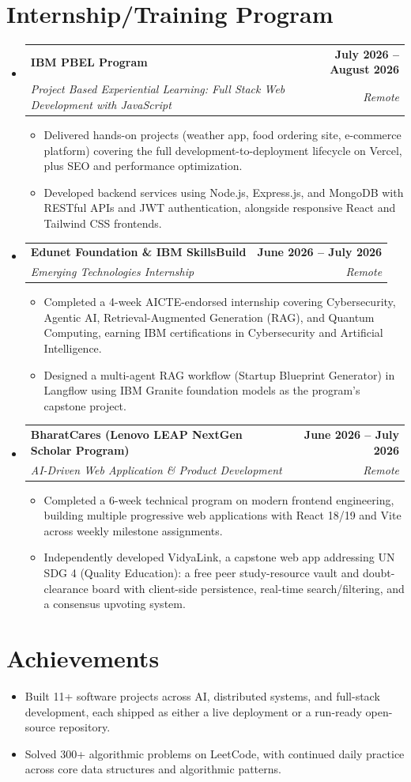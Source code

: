 \documentclass[letterpaper,10pt]{article}
\makeatletter
\newcommand{\resumeItem}[1]{
  \item\small{
    {#1 \vspace{-2pt}}
  }
}
\newcommand{\resumeSubheading}[4]{
  \vspace{-2pt}\item
    \begin{tabular*}{1.0\textwidth}[t]{l@{\extracolsep{\fill}}r}
      \textbf{#1} & \textbf{\small #2} \\
      \textit{\small#3} & \textit{\small #4} \\
    \end{tabular*}\vspace{-7pt}
}
\newcommand{\resumeSubHeadingListStart}{\begin{itemize}[leftmargin=0.0in, label={}]}
\newcommand{\resumeSubHeadingListEnd}{\end{itemize}}
\newcommand{\resumeItemListStart}{\begin{itemize}}
\newcommand{\resumeItemListEnd}{\end{itemize}\vspace{-5pt}}
\makeatother
\begin{document}
\section{Internship/Training Program}
  \resumeSubHeadingListStart
    \resumeSubheading
      {IBM PBEL Program}{July 2026 -- August 2026}
      {Project Based Experiential Learning: Full Stack Web Development with JavaScript}{Remote}
      \resumeItemListStart
        \resumeItem{Delivered hands-on projects (weather app, food ordering site, e-commerce platform) covering the full development-to-deployment lifecycle on Vercel, plus SEO and performance optimization.}
        \resumeItem{Developed backend services using Node.js, Express.js, and MongoDB with RESTful APIs and JWT authentication, alongside responsive React and Tailwind CSS frontends.}
      \resumeItemListEnd
    \resumeSubheading
      {Edunet Foundation \& IBM SkillsBuild}{June 2026 -- July 2026}
      {Emerging Technologies Internship}{Remote}
      \resumeItemListStart
        \resumeItem{Completed a 4-week AICTE-endorsed internship covering Cybersecurity, Agentic AI, Retrieval-Augmented Generation (RAG), and Quantum Computing, earning IBM certifications in Cybersecurity and Artificial Intelligence.}
        \resumeItem{Designed a multi-agent RAG workflow (Startup Blueprint Generator) in Langflow using IBM Granite foundation models as the program's capstone project.}
      \resumeItemListEnd
    \resumeSubheading
      {BharatCares (Lenovo LEAP NextGen Scholar Program)}{June 2026 -- July 2026}
      {AI-Driven Web Application \& Product Development}{Remote}
      \resumeItemListStart
        \resumeItem{Completed a 6-week technical program on modern frontend engineering, building multiple progressive web applications with React 18/19 and Vite across weekly milestone assignments.}
        \resumeItem{Independently developed VidyaLink, a capstone web app addressing UN SDG 4 (Quality Education): a free peer study-resource vault and doubt-clearance board with client-side persistence, real-time search/filtering, and a consensus upvoting system.}
      \resumeItemListEnd
  \resumeSubHeadingListEnd
\vspace{-12pt}

\section{Achievements}
      \resumeItemListStart
\resumeItem{Built 11+ software projects across AI, distributed systems, and full-stack development, each shipped as either a live deployment or a run-ready open-source repository.}
  \vspace{-16pt}
\resumeItem{Solved 300+ algorithmic problems on LeetCode, with continued daily practice across core data structures and algorithmic patterns.}
     \resumeItemListEnd
\end{document}
